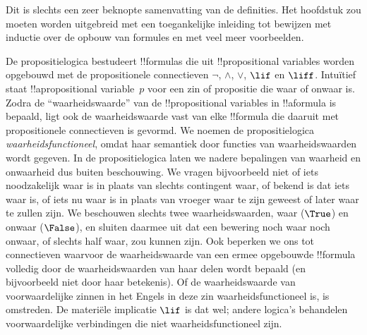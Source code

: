 \documentclass[openany]{memoir}
\begin{document}

\begin{editorial}
  Dit is slechts een zeer beknopte samenvatting van de definities. Het
  hoofdstuk zou moeten worden uitgebreid met een toegankelijke inleiding
  tot bewijzen met inductie over de opbouw van formules en met veel meer
  voorbeelden.
\end{editorial}
\endgroup

\begingroup
\def\olfilename{OLP-0057}
\def\olfilepath{content/propositional-logic/syntax-and-semantics/}
\hypertarget{unit-OLP-0057}{}





De propositielogica bestudeert !!{formula}s die uit
!!{propositional variable}s worden opgebouwd met de propositionele
connectieven $\lnot$, $\land$, $\lor$, $\lif$ en $\liff$. Intuïtief
staat !!a{propositional variable}~$p$ voor een zin of propositie die
waar of onwaar is. Zodra de ``waarheidswaarde'' van de
!!{propositional variable}s in !!a{formula} is bepaald, ligt ook de
waarheidswaarde vast van elke !!{formula} die daaruit met propositionele
connectieven is gevormd. We noemen de propositielogica
\emph{waarheidsfunctioneel}, omdat haar semantiek door functies van
waarheidswaarden wordt gegeven. In de propositielogica laten we nadere
bepalingen van waarheid en onwaarheid dus buiten beschouwing. We vragen
bijvoorbeeld niet of iets noodzakelijk waar is in plaats van slechts
contingent waar, of bekend is dat iets waar is, of iets nu waar is in
plaats van vroeger waar te zijn geweest of later waar te zullen zijn.
We beschouwen slechts twee waarheidswaarden, waar ($\True$) en onwaar
($\False$), en sluiten daarmee uit dat een bewering noch waar noch
onwaar, of slechts half waar, zou kunnen zijn. Ook beperken we ons tot
connectieven waarvoor de waarheidswaarde van een ermee opgebouwde
!!{formula} volledig door de waarheidswaarden van haar delen wordt
bepaald (en bijvoorbeeld niet door haar betekenis). Of de
waarheidswaarde van voorwaardelijke zinnen in het Engels in deze
zin waarheidsfunctioneel is, is omstreden. De materiële implicatie
$\lif$ is dat wel; andere logica's behandelen voorwaardelijke
verbindingen die niet waarheidsfunctioneel zijn.
\end{document}

